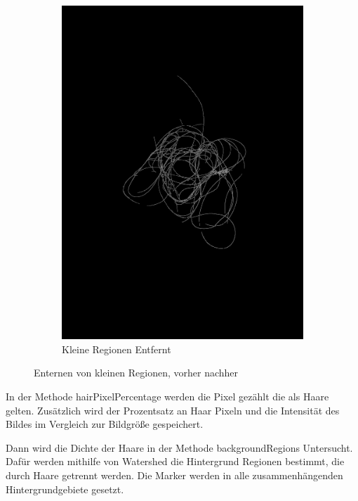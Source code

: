 \documentclass[german,a4paper, 12pt]{llncs}
\begin{document}
\begin{figure}
\begin{subfigure}[b]{0.475\textwidth}
		\includegraphics[width=\textwidth]{fig64/06small regions removed.png}
		\caption[]{Kleine Regionen Entfernt}
		\label{img:smallRegion}
	\end{subfigure}
	\caption[  ]
	{\small Enternen von kleinen Regionen, vorher nachher} 
	\label{img:smallRegionwrap}
\end{figure}

In der Methode hairPixelPercentage werden die Pixel gezählt die als Haare gelten. Zusätzlich wird der Prozentsatz an Haar Pixeln und die Intensität des Bildes im Vergleich zur Bildgröße gespeichert. 

Dann wird die Dichte der Haare in der Methode backgroundRegions Untersucht.
Dafür werden mithilfe von Watershed die Hintergrund Regionen bestimmt, die durch Haare getrennt werden.
Die Marker werden in alle zusammenhängenden Hintergrundgebiete gesetzt.\cite{Watershed,WatershedCV}
\end{document}
